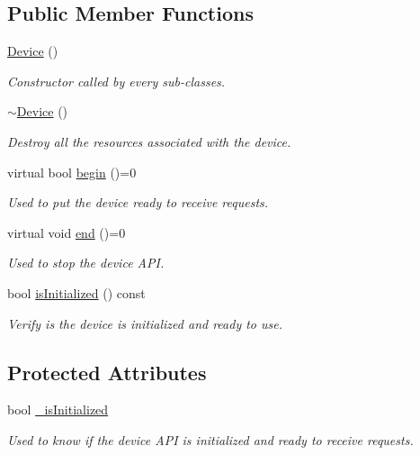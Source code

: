 \subsection*{Public Member Functions}
\begin{DoxyCompactItemize}
\item 
\mbox{\label{class_easyuino_1_1_device_a14b00250154fa77a8c1f766f312c7705}} 
\hyperlink{class_easyuino_1_1_device_a14b00250154fa77a8c1f766f312c7705}{Device} ()
\begin{DoxyCompactList}\small\item\em Constructor called by every sub-\/classes. \end{DoxyCompactList}\item 
\mbox{\label{class_easyuino_1_1_device_a55c8fe2856936c2c770c20da49d5a59d}} 
\hyperlink{class_easyuino_1_1_device_a55c8fe2856936c2c770c20da49d5a59d}{$\sim$\+Device} ()
\begin{DoxyCompactList}\small\item\em Destroy all the resources associated with the device. \end{DoxyCompactList}\item 
virtual bool \hyperlink{class_easyuino_1_1_device_a2e7bb2fec849719a9d9432b57cdb72ba}{begin} ()=0
\begin{DoxyCompactList}\small\item\em Used to put the device ready to receive requests. \end{DoxyCompactList}\item 
virtual void \hyperlink{class_easyuino_1_1_device_ab31018ef64adc84aa2ea575b2297548f}{end} ()=0
\begin{DoxyCompactList}\small\item\em Used to stop the device A\+PI. \end{DoxyCompactList}\item 
bool \hyperlink{class_easyuino_1_1_device_a3761bc02cb81ca0833b535ecaf9a7659}{is\+Initialized} () const
\begin{DoxyCompactList}\small\item\em Verify is the device is initialized and ready to use. \end{DoxyCompactList}\end{DoxyCompactItemize}
\subsection*{Protected Attributes}
\begin{DoxyCompactItemize}
\item 
\mbox{\label{class_easyuino_1_1_device_aa0b9574dae06ba9fc2180cba67d63126}} 
bool \hyperlink{class_easyuino_1_1_device_aa0b9574dae06ba9fc2180cba67d63126}{\+\_\+is\+Initialized}
\begin{DoxyCompactList}\small\item\em Used to know if the device A\+PI is initialized and ready to receive requests. \end{DoxyCompactList}\end{DoxyCompactItemize}


